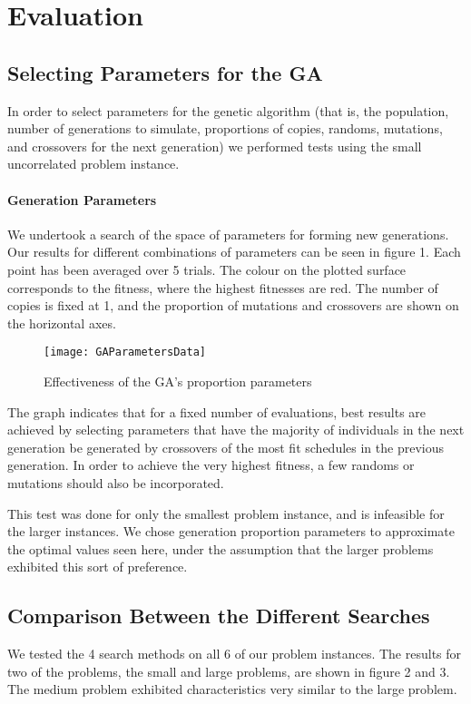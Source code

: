 \documentclass[letterpaper]{article}
\begin{document}
\section{Evaluation}
   \subsection{Selecting Parameters for the GA}
      In order to select parameters for the genetic algorithm (that is, the population, 
      number of generations to simulate, proportions of copies, randoms, mutations, and 
      crossovers for the next generation) we performed tests using the small uncorrelated 
      problem instance.
      
      \paragraph{Generation Parameters}
        We undertook a search of the space of parameters for forming new generations. 
        Our results for different combinations of parameters can be seen in figure 1. 
        Each point has been averaged over 5 trials. The colour on the plotted surface 
        corresponds to the fitness, where the highest fitnesses are red. The number of 
        copies is fixed at 1, and the proportion of mutations and crossovers are shown 
        on the horizontal axes.
        
        \begin{figure}[h]
  		  \centering
  		  \texttt{[image: GAParametersData]}
  	      \caption{Effectiveness of the GA's proportion parameters}
  	      \label{graph:GAParam1}
		\end{figure}	
		
        The graph indicates that for a fixed number of evaluations, best results are 
        achieved by selecting parameters that have the majority of individuals in the next 
        generation be generated by crossovers of the most fit schedules in the previous 
        generation. In order to achieve the very highest fitness, a few randoms or mutations 
        should also be incorporated.
        
        This test was done for only the smallest problem instance, and is infeasible for the 
        larger instances. We chose generation proportion parameters to approximate the optimal 
        values seen here, under the assumption that the larger problems exhibited this sort of 
        preference.
      
  \subsection{Comparison Between the Different Searches}
    We tested the 4 search methods on all 6 of our problem instances. The results 
    for two of the problems, the small and large problems, are shown in figure 2 
    and 3. The medium problem exhibited characteristics very similar to the large problem.
    
\end{document}
